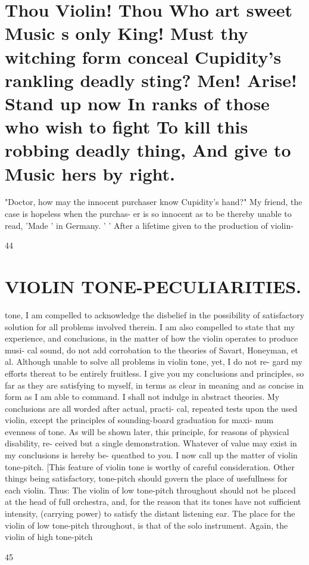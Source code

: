\documentclass{article}
\begin{document}
\section*{Thou Violin! Thou Who art sweet Music s only King! Must thy witching form conceal Cupidity's rankling deadly sting? Men! Arise! Stand up now In ranks of those who wish to fight To kill this robbing deadly thing, And give to Music hers by right.}
"Doctor, how may the innocent purchaser know Cupidity's hand?" My friend, the case is hopeless when the purchas- er is so innocent as to be thereby unable to read, 'Made ' in Germany. ' ' After a lifetime given to the production of violin-

44

\section*{VIOLIN TONE-PECULIARITIES.}
tone, I am compelled to acknowledge the disbelief in the possibility of satisfactory solution for all problems involved therein. I am also compelled to state that my experience, and conclusions, in the matter of how the violin operates to produce musi- cal sound, do not add corrobation to the theories of Savart, Honeyman, et al. Although unable to solve all problems in violin tone, yet, I do not re- gard my efforts thereat to be entirely fruitless. I give you my conclusions and principles, so far as they are satisfying to myself, in terms as clear in meaning and as concise in form as I am able to command. I shall not indulge in abstract theories. My conclusions are all worded after actual, practi- cal, repeated tests upon the used violin, except the principles of sounding-board graduation for maxi- mum evenness of tone. As will be shown later, this principle, for reasons of physical disability, re- ceived but a single demonstration. Whatever of value may exist in my conclusions is hereby be- queathed to you. I now call up the matter of violin tone-pitch. [This feature of violin tone is worthy of careful consideration. Other things being satisfactory, tone-pitch should govern the place of usefullness for each violin. Thus: The violin of low tone-pitch throughout should not be placed at the head of full orchestra, and, for the reason that its tones have not sufficient intensity, (carrying power) to satisfy the distant listening ear. The place for the violin of low tone-pitch throughout, is that of the solo instrument. Again, the violin of high tone-pitch

45
\end{document}

